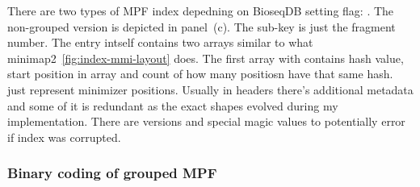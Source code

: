 There are two types of MPF index depedning on BioseqDB setting flag: .
The non-grouped version is depicted in panel~(c). The sub-key is just the fragment number. The entry intself contains two arrays similar to what minimap2~\ref{fig:index-mmi-layout} does.
The first array with  contains hash value, start position in  array and count of how many positiosn have that same hash.
 just represent minimizer positions.
Usually in headers there's additional metadata and some of it is redundant as the exact shapes evolved during my implementation. 
There are versions and special magic values to potentially error if index was corrupted.

\subsubsection{Binary coding of grouped MPF}

